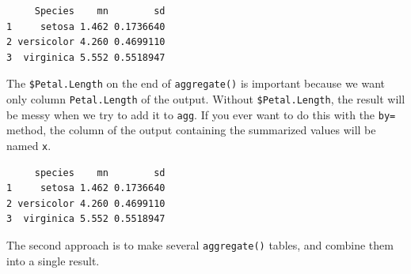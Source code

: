 \documentclass[
  13,
  letterpaper,
]{report}
\newenvironment{Shaded}{\begin{snugshade}}{\end{snugshade}}
\newcommand{\AttributeTok}[1]{\textcolor[rgb]{0.40,0.45,0.13}{#1}}
\newcommand{\CommentTok}[1]{\textcolor[rgb]{0.37,0.37,0.37}{#1}}
\newcommand{\DocumentationTok}[1]{\textcolor[rgb]{0.37,0.37,0.37}{\textit{#1}}}
\newcommand{\FunctionTok}[1]{\textcolor[rgb]{0.28,0.35,0.67}{#1}}
\newcommand{\NormalTok}[1]{\textcolor[rgb]{0.00,0.23,0.31}{#1}}
\newcommand{\OtherTok}[1]{\textcolor[rgb]{0.00,0.23,0.31}{#1}}
\newcommand{\SpecialCharTok}[1]{\textcolor[rgb]{0.37,0.37,0.37}{#1}}
\newcommand{\StringTok}[1]{\textcolor[rgb]{0.13,0.47,0.30}{#1}}
\begin{document}
\begin{verbatim}
     Species    mn        sd
1     setosa 1.462 0.1736640
2 versicolor 4.260 0.4699110
3  virginica 5.552 0.5518947
\end{verbatim}

The \texttt{\$Petal.Length} on the end of \texttt{aggregate()} is
important because we want only column \texttt{Petal.Length} of the
output. Without \texttt{\$Petal.Length}, the result will be messy when
we try to add it to \texttt{agg}. If you ever want to do this with the
\texttt{by=} method, the column of the output containing the summarized
values will be named \texttt{x}.

\begin{Shaded}
\end{Shaded}

\begin{verbatim}
     species    mn        sd
1     setosa 1.462 0.1736640
2 versicolor 4.260 0.4699110
3  virginica 5.552 0.5518947
\end{verbatim}

The second approach is to make several \texttt{aggregate()} tables, and
combine them into a single result.
\end{document}
